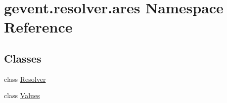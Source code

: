 \hypertarget{namespacegevent_1_1resolver_1_1ares}{}\section{gevent.\+resolver.\+ares Namespace Reference}
\label{namespacegevent_1_1resolver_1_1ares}
\subsection*{Classes}
\begin{DoxyCompactItemize}
\item 
class \hyperlink{classgevent_1_1resolver_1_1ares_1_1_resolver}{Resolver}
\item 
class \hyperlink{classgevent_1_1resolver_1_1ares_1_1_values}{Values}
\end{DoxyCompactItemize}

